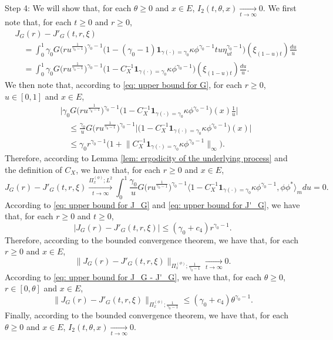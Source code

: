 \documentclass[12pt, a4paper]{amsart}
\theoremstyle{definition}
\numberwithin{equation}{section}
\begin{document}
	Step 4: We will show that, for each $\theta \geq 0$ and $x\in E$, $I_2(t,\theta,x) \xrightarrow[t\to \infty]{} 0$. 
	We first note that, for each $t\geq 0$ and $r\geq 0$,
\[\begin{split}
	&J_G(r) - J'_G(t,r,\xi)
	\\&\quad = \int_0^1 \gamma_0 G\big( ru^{\frac{1}{\gamma_0 - 1}} \big) ^{\gamma_0 - 1} \big( 1- (\gamma_0 - 1) \mathbf 1_{\gamma(\cdot) = \gamma_0} \kappa \phi^{\gamma_0 - 1} tu\eta_{ut}^{\gamma_0 - 1} \big)(\xi_{(1-u)t}) \frac{du}{u}
	\\&\quad = \int_0^1 \gamma_0 G\big( ru^{\frac{1}{\gamma_0 - 1}} \big) ^{\gamma_0 - 1} \big( 1- C_X^{-1}\mathbf 1_{\gamma(\cdot) = \gamma_0} \kappa \phi^{\gamma_0 - 1} \big)(\xi_{(1-u)t}) \frac{du}{u}.
\end{split}\]
	We then note that, according to \eqref{eq: upper bound for G}, for each $r \geq 0$, $u\in [0,1]$ and $x\in E$,
\[\begin{split}
	&\big| \gamma_0 G\big( ru^{\frac{1}{\gamma_0 - 1}} \big) ^{\gamma_0 - 1} \big( 1- C_X^{-1}\mathbf 1_{\gamma(\cdot) = \gamma_0} \kappa \phi^{\gamma_0 - 1} \big)(x) \frac{1}{u} \big|
	\\&\quad \leq \frac{\gamma_0}{u} G\big( ru^{\frac{1}{\gamma_0 - 1}} \big) ^{\gamma_0 - 1} \big|\big( 1- C_X^{-1}\mathbf 1_{\gamma(\cdot) = \gamma_0} \kappa \phi^{\gamma_0 - 1} \big)(x) \big| 
	\\&\quad \leq \gamma_0r^{\gamma_0 - 1} \big( 1+ \big\|C_X^{-1}\mathbf 1_{\gamma(\cdot) = \gamma_0} \kappa \phi^{\gamma_0 - 1} \big\|_\infty \big).
\end{split} \]
	Therefore, according to Lemma \ref{lem: ergodicity of the underlying process} and the definition of $C_X$, we have that, for each $r\geq 0$ and $x\in E$,
\[
	J_G(r) - J'_G(t,r,\xi)
	\xrightarrow[t\to \infty]{\Pi_x^{(\phi)};L^2} \int_0^1 \frac{\gamma_0}{u} G\big( ru^{\frac{1}{\gamma_0 - 1}} \big) ^{\gamma_0 - 1} \big\langle 1- C_X^{-1}\mathbf 1_{\gamma(\cdot) = \gamma_0} \kappa \phi^{\gamma_0 - 1}, \phi\phi^*\big\rangle_m du
	=0.
\]
	According to \eqref{eq: upper bound for J_G} and \eqref{eq: upper bound for J'_G}, we have that, for each $r\geq 0$ and $t\geq 0$,
\[ \label{eq: upper bound for J_G - J'_G}
	\big| J_G(r) - J'_G(t,r,\xi)\big|
	\leq (\gamma_0 + c_4) r^{\gamma_0 - 1}.
\]
	Therefore, according to the bounded convergence theorem, we have that, for each $r\geq 0$ and $x\in E$,
\[
	 \big\|  J_G(r) - J'_G(t,r,\xi)  \big\|_{\Pi_x^{(\phi)};\frac{1}{\gamma_0 - 1}} 
	 \xrightarrow[t\to \infty]{} 0.
\]
	According to \eqref{eq: upper bound for J_G - J'_G}, we have that, for each $\theta \geq 0$, $r\in [0,\theta]$ and $x\in E$,
\[
	\big\|  J_G(r) - J'_G(t,r,\xi)  \big\|_{\Pi_x^{(\phi)};\frac{1}{\gamma_0 - 1}} 
	\leq (\gamma_0 + c_4) \theta^{\gamma_0 - 1}.
\]
	Finally, according to the bounded convergence theorem, we have that, for each $\theta\geq 0$ and $x\in E$, $I_2(t,\theta,x)\xrightarrow[t\to \infty]{} 0$.
	
\end{document}
